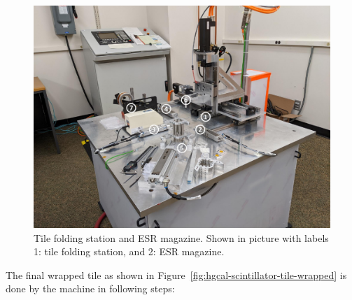 \begin{figure}[!ht]
  \centering
  \includegraphics[width=\textwidth,page=2]{figures/wrapper_machine_pics.pdf}
  \caption[Tile folding station and ESR magazine]
  {Tile folding station and ESR magazine. Shown in picture
    with labels 1: tile folding station, and 2: ESR magazine.}%
  \label{fig:wrapper-overview-2}
\end{figure}

The final wrapped tile as shown in Figure~\ref{fig:hgcal-scintillator-tile-wrapped}
is done by the machine in following steps:

